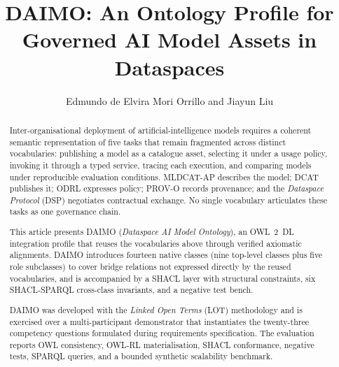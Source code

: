 \documentclass[Afour,sagev,times]{sagej}
\begin{document}

\title{DAIMO: An Ontology Profile for Governed AI Model Assets in Dataspaces}

\author{Edmundo de Elvira Mori Orrillo and Jiayun Liu}




\begin{abstract}
Inter-organisational deployment of artificial-intelligence models requires a coherent semantic representation of five tasks that remain fragmented across distinct vocabularies: publishing a model as a catalogue asset, selecting it under a usage policy, invoking it through a typed service, tracing each execution, and comparing models under reproducible evaluation conditions. MLDCAT-AP describes the model; DCAT publishes it; ODRL expresses policy; PROV-O records provenance; and the \emph{Dataspace Protocol} (DSP) negotiates contractual exchange. No single vocabulary articulates these tasks as one governance chain.

This article presents DAIMO (\emph{Dataspace AI Model Ontology}), an OWL~2~DL integration profile that reuses the vocabularies above through verified axiomatic alignments. DAIMO introduces fourteen native classes (nine top-level classes plus five role subclasses) to cover bridge relations not expressed directly by the reused vocabularies, and is accompanied by a SHACL layer with structural constraints, six SHACL-SPARQL cross-class invariants, and a negative test bench.

DAIMO was developed with the \emph{Linked Open Terms} (LOT) methodology and is exercised over a multi-participant demonstrator that instantiates the twenty-three competency questions formulated during requirements specification. The evaluation reports OWL consistency, OWL-RL materialisation, SHACL conformance, negative tests, SPARQL queries, and a bounded synthetic scalability benchmark.
\end{abstract}

\end{document}
